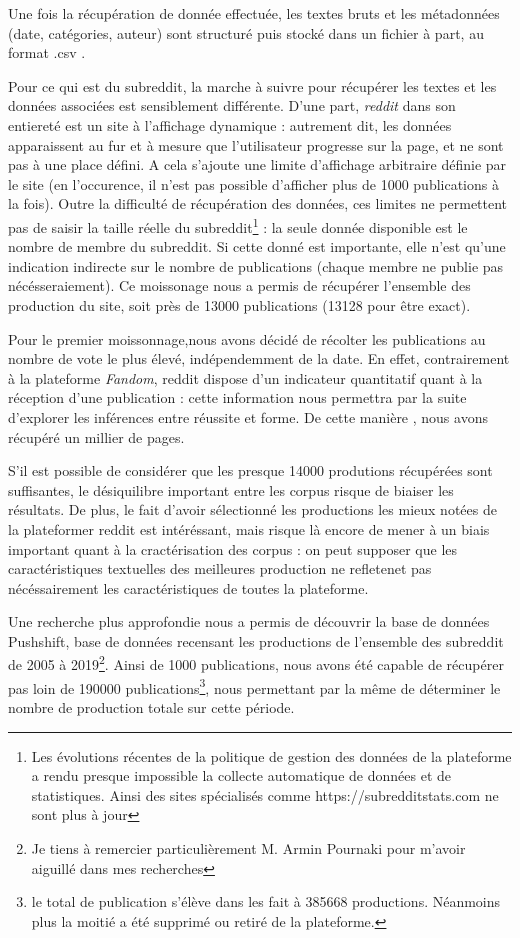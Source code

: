 \documentclass[12pt,a4paper,oneside,titlepage]{article} %
\begin{document}
	Une fois la récupération de donnée effectuée, les textes bruts et les métadonnées (date, catégories, auteur) sont structuré puis stocké dans un fichier à part, au format .csv .
	
	Pour ce qui est du subreddit, la marche à suivre pour récupérer les textes et les données associées est sensiblement différente. D'une part, \emph{reddit} dans son entiereté est un site à l'affichage dynamique : autrement dit, les données apparaissent au fur et à mesure que l'utilisateur progresse sur la page, et ne sont pas à une place défini. A cela s'ajoute une limite d'affichage arbitraire définie par le site (en l'occurence, il n'est pas possible d'afficher plus de 1000 publications à la fois). 
	Outre la difficulté de récupération des données, ces limites ne permettent pas de saisir la taille réelle du subreddit\footnote{Les évolutions récentes de la politique de gestion des données de la plateforme a rendu presque impossible la collecte automatique de données et de statistiques. Ainsi des sites spécialisés comme https://subredditstats.com ne sont plus à jour} : la seule donnée disponible est le nombre de membre du subreddit. Si cette donné est importante, elle n'est qu'une indication indirecte sur le nombre de publications (chaque membre ne publie pas nécésseraiement). 
	Ce moissonage nous a permis de récupérer l'ensemble des production du site, soit près de 13000 publications (13128 pour être exact).
		
	Pour le premier moissonnage,nous avons décidé de récolter les publications au nombre de vote le plus élevé, indépendemment de la date. En effet, contrairement à la plateforme \textit{Fandom}, reddit dispose d'un indicateur quantitatif quant à la réception d'une publication : cette information nous permettra par la suite d'explorer les inférences entre réussite et forme.
	De cette manière , nous avons récupéré un millier de pages. 
	
	S'il est possible de considérer que les presque 14000 produtions récupérées sont suffisantes, le désiquilibre important entre les corpus risque de biaiser les résultats. De plus, le fait d'avoir sélectionné les productions les mieux notées de la plateformer reddit est intéréssant, mais risque là encore de mener à un biais important quant à la cractérisation des corpus : on peut supposer que les caractéristiques textuelles des meilleures production ne refletenet pas nécéssairement les caractéristiques de toutes la plateforme.
	
	Une recherche plus approfondie nous a permis de découvrir la base de données Pushshift, base de données recensant les productions de l'ensemble des subreddit de 2005 à 2019\footnote{Je tiens à remercier particulièrement M. Armin Pournaki pour m'avoir aiguillé dans mes recherches}. Ainsi de 1000 publications, nous avons été capable de récupérer pas loin de 190000 publications\footnote{le total de publication s'élève dans les fait à 385668 productions. Néanmoins plus la moitié a été supprimé ou retiré de la plateforme.}, nous permettant par la même de déterminer le nombre de production totale sur cette période.
	
\end{document}
